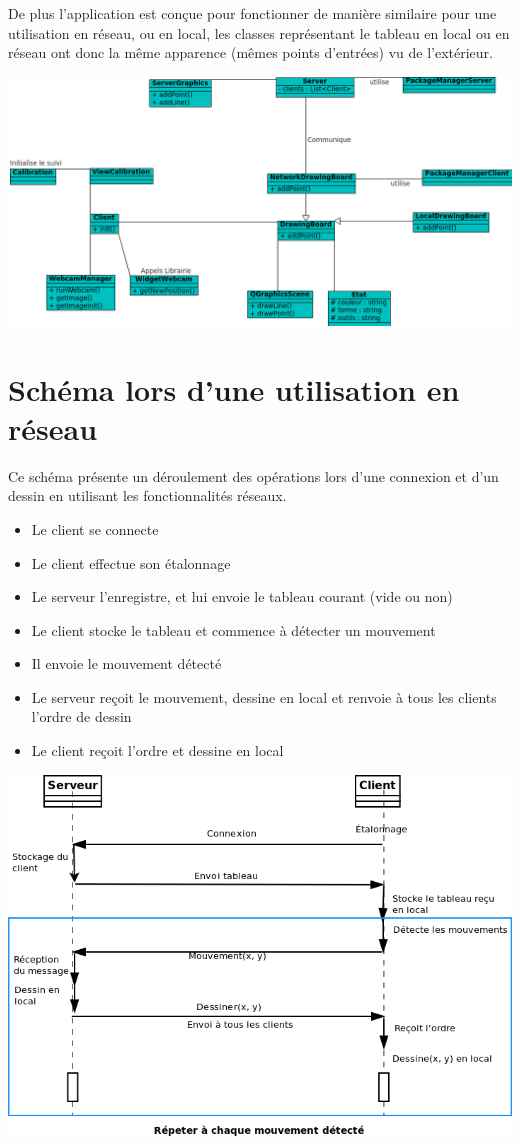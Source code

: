 \documentclass{article}
\begin{document}
De plus l'application est conçue pour fonctionner de manière similaire pour une utilisation en réseau, ou en local, les classes 
représentant le tableau en local ou en réseau ont donc la même apparence (mêmes points d'entrées) vu de l'extérieur. \\
	\begin{center}
	\includegraphics[scale=0.7]{../uml/classes.png}
	\end{center}

\section{Schéma lors d'une utilisation en réseau}
Ce schéma présente un déroulement des opérations lors d'une connexion et d'un dessin en utilisant les fonctionnalités réseaux.\\

\begin{itemize}
	\item Le client se connecte
	\item Le client effectue son étalonnage
	\item Le serveur l'enregistre, et lui envoie le tableau courant (vide ou non)
	\item Le client stocke le tableau et commence à détecter un mouvement
	\item Il envoie le mouvement détecté
	\item Le serveur reçoit le mouvement, dessine en local et renvoie à tous les clients l'ordre de dessin
	\item Le client reçoit l'ordre et dessine en local
\end{itemize}

\begin{center}
	\includegraphics[scale=0.5]{../uml/sequence_reseau.png}
\end{center}
\end{document}
